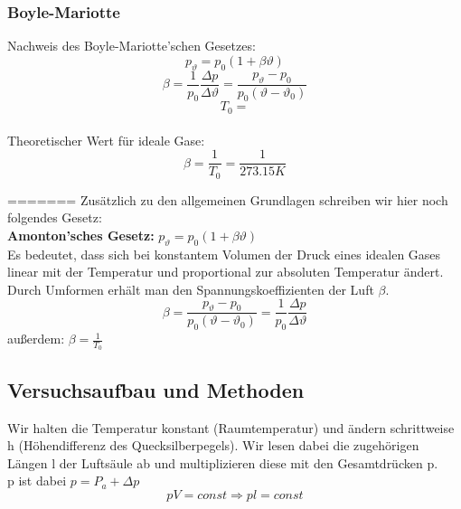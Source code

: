 \documentclass{article}
\begin{document}
\subsubsection{Boyle-Mariotte}
Nachweis des Boyle-Mariotte'schen Gesetzes:\\

$$p_{\vartheta}=p_0 (1+\beta \vartheta)$$
$$\beta=\frac{1}{p_0}\frac{\Delta p}{\Delta \vartheta}=\frac{p_{\vartheta}-p_0}{p_0(\vartheta - \vartheta_0)}$$
$$T_0=$$
\\
Theoretischer Wert für ideale Gase:\\
$$\beta=\frac{1}{T_0}=\frac{1}{273.15K}$$



=======
Zusätzlich zu den allgemeinen Grundlagen schreiben wir hier noch folgendes Gesetz:\\
\textbf{Amonton'sches Gesetz:} $p_\vartheta=p_0 (1+\beta\vartheta)$\\
Es bedeutet, dass sich bei konstantem Volumen der Druck eines idealen Gases linear mit der Temperatur und proportional zur absoluten Temperatur ändert. \\
Durch Umformen erhält man den Spannungskoeffizienten der Luft $\beta$.
$$\beta=\frac{p_\vartheta-p_0}{p_0(\vartheta-\vartheta_0)}=\frac{1}{p_0}\frac{\Delta p}{\Delta \vartheta}$$
außerdem: $\beta=\frac{1}{T_0}$
\subsection{Versuchsaufbau und Methoden}
Wir halten die Temperatur konstant (Raumtemperatur) und ändern schrittweise h (Höhendifferenz des Quecksilberpegels). Wir lesen dabei die zugehörigen Längen l der Luftsäule ab und multiplizieren diese mit den Gesamtdrücken p.\\
p ist dabei $p=P_a + \Delta p$
$$pV=const \Rightarrow pl=const$$
\end{document}
